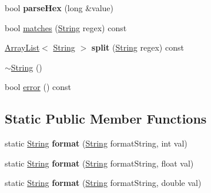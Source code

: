 \begin{DoxyCompactItemize}
\item 
bool {\bfseries parse\+Hex} (long \&value)\hypertarget{classisat__utils_1_1_string_ad18ef87cc71dbb4e5b84f7ba5dc8c03a}{}\label{classisat__utils_1_1_string_ad18ef87cc71dbb4e5b84f7ba5dc8c03a}

\item 
bool \hyperlink{classisat__utils_1_1_string_a13d1ca3a639362ddc294de879a0345fa}{matches} (\hyperlink{classisat__utils_1_1_string}{String} regex) const 
\item 
\hyperlink{classisat__utils_1_1_array_list}{Array\+List}$<$ \hyperlink{classisat__utils_1_1_string}{String} $>$ {\bfseries split} (\hyperlink{classisat__utils_1_1_string}{String} regex) const \hypertarget{classisat__utils_1_1_string_a632bc227a1d158e511f1d2abf52f6bc2}{}\label{classisat__utils_1_1_string_a632bc227a1d158e511f1d2abf52f6bc2}

\item 
\hyperlink{classisat__utils_1_1_string_a4c903ee6fadb521dac0d4ff2686c3384}{$\sim$\+String} ()
\item 
bool \hyperlink{classisat__utils_1_1_string_a6cc57bb76f496f68ed9f4e2d0d19514b}{error} () const 
\end{DoxyCompactItemize}
\subsection*{Static Public Member Functions}
\begin{DoxyCompactItemize}
\item 
static \hyperlink{classisat__utils_1_1_string}{String} {\bfseries format} (\hyperlink{classisat__utils_1_1_string}{String} format\+String, int val)\hypertarget{classisat__utils_1_1_string_ac31a5a9fbcbbc2b90a71332fb550ba27}{}\label{classisat__utils_1_1_string_ac31a5a9fbcbbc2b90a71332fb550ba27}

\item 
static \hyperlink{classisat__utils_1_1_string}{String} {\bfseries format} (\hyperlink{classisat__utils_1_1_string}{String} format\+String, float val)\hypertarget{classisat__utils_1_1_string_a8b7108ef6f8c8a5226d858dc79dfc8bd}{}\label{classisat__utils_1_1_string_a8b7108ef6f8c8a5226d858dc79dfc8bd}

\item 
static \hyperlink{classisat__utils_1_1_string}{String} {\bfseries format} (\hyperlink{classisat__utils_1_1_string}{String} format\+String, double val)\hypertarget{classisat__utils_1_1_string_a5147fa966d10e0e07344becb2a3dd62d}{}\label{classisat__utils_1_1_string_a5147fa966d10e0e07344becb2a3dd62d}

\end{DoxyCompactItemize}
